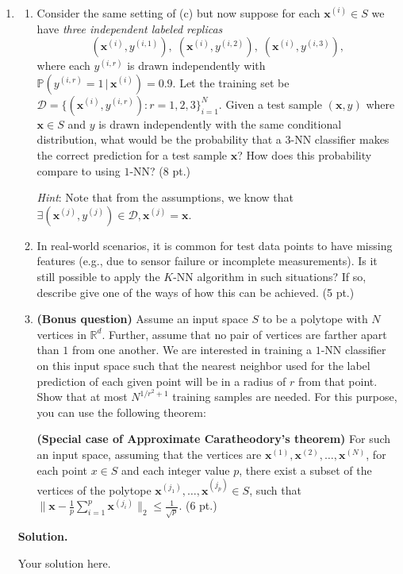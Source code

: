 \documentclass{article}
\newcommand{\bx}{{\boldsymbol x}}
\def\R{\mathbb{R}}
\theoremstyle{definition}
\theoremstyle{remark}
\newenvironment{Q}
        {%
          \clearpage
          \item
        }
        {%
          \phantom{s} 
          \bigskip
        }
\begin{document}
\begin{enumerate}[font={\Large\bfseries},left=0pt]
\begin{Q}
\begin{enumerate}
\item
Consider the same setting of (c) but 
now suppose for each \(\bx^{(i)}\in S\) we have \emph{three independent labeled replicas}
\[
(\bx^{(i)},y^{(i,1)}),\;(\bx^{(i)},y^{(i,2)}),\;(\bx^{(i)},y^{(i,3)}),
\]
where each \(y^{(i,r)}\) is drawn independently with
\(\mathbb{P}(y^{(i,r)}=1\,|\,\bx^{(i)})=0.9\).
Let the training set be
\(\mathcal D=\{(\bx^{(i)},y^{(i,r)}):  r=1,2,3\}_{i=1}^{N}\).
Given a test sample \((\bx,y)\) where \(\bx\in S\) and \(y\) is drawn independently with the same conditional distribution,
what would be the probability that a $3$-NN classifier makes the correct prediction for a test sample $\bx$? How does this probability compare to using $1$-NN? (8 pt.)

\textit{Hint}: Note that from the assumptions, we know that $\exists (\bx^{(j)}, y^{(j)}) \in \mathcal{D}, \bx^{(j)} = \bx$.
\item In real-world scenarios, it is common for test data points to have missing features (e.g., due to sensor failure or incomplete measurements). Is it still possible to apply the $K$-NN algorithm in such situations? If so, describe give one of the ways of how this can be achieved. (5 pt.)

\item \textbf{(Bonus question)} Assume an input space $S$ to be a polytope with $N$ vertices in $\R^d$. Further, assume that no pair of vertices are farther apart than $1$ from one another. We are interested in training a $1$-NN classifier on this input space such that the nearest neighbor used for the label prediction of each given point will be in a radius of $r$ from that point. Show that at most $N^{1/r^2 + 1}$ training samples are needed. For this purpose, you can use the following theorem:  

\textbf{(Special case of Approximate Caratheodory's theorem)} For such an input space, assuming that the vertices are $\bx^{(1)}, \bx^{(2)}, \dots, \bx^{(N)}$, for each point $x \in S$ and each integer value $p$, there exist a subset of the vertices of the polytope $\bx^{(j_1)},\dots,\bx^{(j_p)} \in S$, such that $ \| \bx- \frac{1}{p} \sum_{i=1}^p \bx^{(j_i)}\|_2 \leq \frac{1}{\sqrt{p}}$. (6 pt.)

\end{enumerate}
\end{Q}

\textbf{Solution.}
    \begin{tcolorbox}
    Your solution here.
    \end{tcolorbox}


\end{enumerate}
\end{document}

